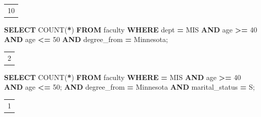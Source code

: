 \documentclass[
]{article}
\newenvironment{Shaded}{\begin{snugshade}}{\end{snugshade}}
\newcommand{\DecValTok}[1]{\textcolor[rgb]{0.00,0.00,0.81}{#1}}
\newcommand{\FunctionTok}[1]{\textcolor[rgb]{0.00,0.00,0.00}{#1}}
\newcommand{\KeywordTok}[1]{\textcolor[rgb]{0.13,0.29,0.53}{\textbf{#1}}}
\newcommand{\NormalTok}[1]{#1}
\newcommand{\OperatorTok}[1]{\textcolor[rgb]{0.81,0.36,0.00}{\textbf{#1}}}
\newcommand{\StringTok}[1]{\textcolor[rgb]{0.31,0.60,0.02}{#1}}
\begin{document}
\begin{longtable}[]{@{}l@{}}
\toprule
 \\
\midrule
\endhead
10 \\
\bottomrule
\end{longtable}

\begin{Shaded}
\begin{Highlighting}[]
\KeywordTok{SELECT} \FunctionTok{COUNT}\NormalTok{(}\OperatorTok{*}\NormalTok{) }\KeywordTok{FROM}\NormalTok{ faculty}
    \KeywordTok{WHERE}\NormalTok{ dept }\OperatorTok{=} \StringTok{\textquotesingle{}MIS\textquotesingle{}}
    \KeywordTok{AND}\NormalTok{ age }\OperatorTok{\textgreater{}=} \DecValTok{40} \KeywordTok{AND}\NormalTok{ age }\OperatorTok{\textless{}=} \DecValTok{50}
    \KeywordTok{AND}\NormalTok{ degree\_from }\OperatorTok{=} \StringTok{\textquotesingle{}Minnesota\textquotesingle{}}\NormalTok{; }
\end{Highlighting}
\end{Shaded}

\begin{longtable}[]{@{}l@{}}
\toprule
 \\
\midrule
\endhead
2 \\
\bottomrule
\end{longtable}

\begin{Shaded}
\begin{Highlighting}[]
\KeywordTok{SELECT} \FunctionTok{COUNT}\NormalTok{(}\OperatorTok{*}\NormalTok{) }\KeywordTok{FROM}\NormalTok{ faculty}
    \KeywordTok{WHERE} \OperatorTok{=} \StringTok{\textquotesingle{}MIS\textquotesingle{}}
    \KeywordTok{AND}\NormalTok{ age }\OperatorTok{\textgreater{}=} \DecValTok{40} \KeywordTok{AND}\NormalTok{ age }\OperatorTok{\textless{}=} \DecValTok{50}\NormalTok{;}
    \KeywordTok{AND}\NormalTok{ degree\_from }\OperatorTok{=} \StringTok{\textquotesingle{}Minnesota\textquotesingle{}}
    \KeywordTok{AND}\NormalTok{ marital\_status }\OperatorTok{=} \StringTok{\textquotesingle{}S\textquotesingle{}}\NormalTok{; }
\end{Highlighting}
\end{Shaded}

\begin{longtable}[]{@{}l@{}}
\toprule
 \\
\midrule
\endhead
1 \\
\bottomrule
\end{longtable}
\end{document}

